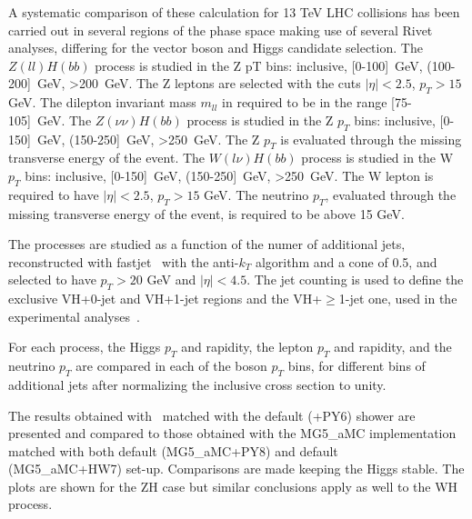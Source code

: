 A systematic comparison of these calculation for 13 TeV LHC collisions
has been carried out in several regions of the phase space
making use of several Rivet~\cite{rivet} analyses, differing for the vector boson and Higgs candidate selection.
The $Z(ll)H(bb)$ process is studied in the Z pT bins: inclusive, [0-100]~GeV, (100-200]~GeV, >200~GeV.
The Z leptons are selected with the cuts $|\eta| <2.5$, $p_{T} > 15$ GeV.
The dilepton invariant mass $m_{ll}$ in required to be in the range [75-105]~GeV.
The $Z(\nu\nu)H(bb)$ process is studied in the Z $p_{T}$ bins: inclusive, [0-150]~GeV, (150-250]~GeV, >250~GeV.
The Z $p_{T}$ is evaluated through the missing transverse energy of the event.
The $W(l\nu)H(bb)$ process is studied in the W $p_{T}$ bins: inclusive, [0-150]~GeV, (150-250]~GeV, >250~GeV.
The W lepton is required to have $|\eta|<2.5$, $p_{T} > 15$ GeV.
The neutrino $p_{T}$, evaluated through the missing transverse energy of the event, is required to be above 15 GeV.

The processes are studied as a function of the numer of additional jets,
reconstructed with fastjet~\cite{Cacciari:2011ma} with the anti-$k_T$ algorithm and a cone of 0.5, 
and selected to have $p_T > 20$ GeV and $|\eta| < 4.5$.
The jet counting is used to define the exclusive VH+0-jet and VH+1-jet regions and the VH+$\geq$1-jet one, 
used in the experimental analyses~\cite{Aad:2014xzb,Chatrchyan:2013zna}.

For each process, the Higgs $p_T$ and rapidity, the lepton $p_T$ and rapidity, and the neutrino $p_T$
are compared in each of the boson $p_T$ bins, for different bins of additional jets
after normalizing the inclusive cross section to unity.

The results obtained with \POWHEGBOX\ matched with the default  (\POWHEG{}+PY6) shower are presented and compared 
to those obtained with the {\sc MG5\_aMC} implementation matched with both default  ({\sc MG5\_aMC}+PY8) and default ~\cite{Bellm:2015jjp,Bahr:2008pv} ({\sc MG5\_aMC}+HW7) set-up. 
%
Comparisons are made keeping the Higgs stable.
The plots are shown for the ZH case but similar conclusions apply as well to the WH process.
%
%

